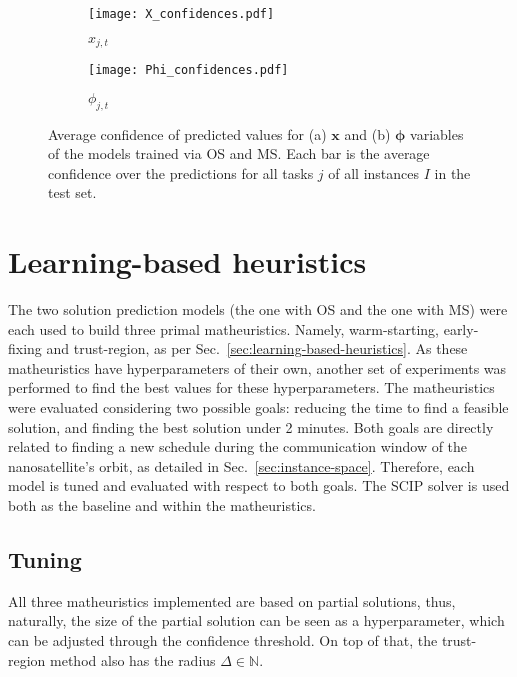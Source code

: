 \begin{figure}[h]
    \centering
    \begin{subfigure}{0.49\textwidth}
        \centering
        \texttt{[image: X\_confidences.pdf]}
        \caption{$x_{j,t}$}\label{fig:conf-x}
    \end{subfigure}
    \begin{subfigure}{0.49\textwidth}
        \centering
        \texttt{[image: Phi\_confidences.pdf]}
        \caption{$\phi_{j,t}$}\label{fig:conf-phi}
    \end{subfigure}
    \caption{Average confidence of predicted values for (a) $\bm{x}$ and (b) $\bm{\phi}$ variables of the models trained via OS and MS. Each bar is the average confidence over the predictions for all tasks $j$ of all instances $I$ in the test set.}
    \label{fig:prediction-confidences}
\end{figure}

\section{Learning-based heuristics}

The two solution prediction models (the one with OS and the one with MS) were each used to build three primal matheuristics.
Namely, warm-starting, early-fixing and trust-region, as per Sec.~\ref{sec:learning-based-heuristics}.
As these matheuristics have hyperparameters of their own, another set of experiments was performed to find the best values for these hyperparameters.
The matheuristics were evaluated considering two possible goals: reducing the time to find a feasible solution, and finding the best solution under 2 minutes.
Both goals are directly related to finding a new schedule during the communication window of the nanosatellite's orbit, as detailed in Sec.~\ref{sec:instance-space}.
Therefore, each model is tuned and evaluated with respect to both goals.
The SCIP solver is used both as the baseline and within the matheuristics.

\subsection{Tuning}

All three matheuristics implemented are based on partial solutions, thus, naturally, the size of the partial solution can be seen as a hyperparameter, which can be adjusted through the confidence threshold.
On top of that, the trust-region method also has the radius $\Delta\in \mathbb{N}$.


